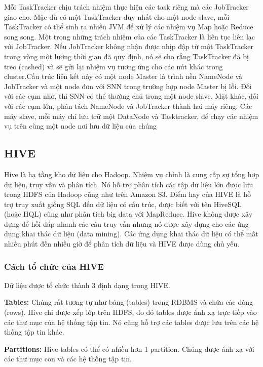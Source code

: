\begin{itemize}
Mỗi TaskTracker chịu trách nhiệm thực hiện các task riêng mà các JobTracker giao cho. Mặc dù có một TaskTracker duy nhất cho một node slave, mỗi TaskTracker có thể sinh ra nhiều JVM để xử lý các nhiệm vụ Map hoặc Reduce song song. Một trong những trách nhiệm của các TaskTracker là liên tục liên lạc với JobTracker. Nếu JobTracker không nhận được nhịp đập từ một TaskTracker trong vòng một lượng thời gian đã quy định, nó sẽ cho rằng TaskTracker đã bị treo (cashed) và sẽ gửi lại nhiệm vụ tương ứng cho các nút khác trong cluster.Cấu trúc liên kết này có một node Master là trình nền NameNode và JobTracker và một node đơn với SNN trong trường hợp node Master bị lỗi. Đối với các cụm nhở, thì SNN có thể thường chú trong một node slave. Mặt khác, đối với các cụm lớn, phân tách NameNode và JobTracker thành hai máy riêng. Các máy slave, mỗi máy chỉ lưu trữ một DataNode và Tasktracker, để chạy các nhiệm vụ trên cùng một node nơi lưu dữ liệu của chúng
\end{itemize}
\subsection{HIVE}
Hive là hạ tầng kho dữ liệu cho Hadoop. Nhiệm vụ chính là cung cấp sự tổng hợp dữ liệu, truy vấn và phân tích. Nó hỗ trợ phân tích các tập dữ liệu lớn được lưu trong HDFS của Hadoop cũng như trên Amazon S3. Điểm hay của HIVE là hỗ trợ truy xuất giống SQL đến dữ liệu có cấu trúc, được biết với tên HiveSQL (hoặc HQL) cũng như phân tích big data với MapReduce. Hive không được xây dựng để hồi đáp nhanh các câu truy vấn nhưng nó được xây dựng cho các ứng dụng khai thác dữ liệu (data mining). Các ứng dụng khai thác dữ liệu có thể mất nhiều phút đến nhiều giờ để phân tích dữ liệu và HIVE được dùng chủ yếu.\par 
\subsubsection{Cách tổ chức của HIVE}
Dữ liệu được tổ chức thành 3 định dạng trong HIVE.\par

\textbf{Tables:} Chúng rất tương tự như bảng (tables) trong RDBMS và chứa các dòng (rows). Hive chỉ được xếp lớp trên HDFS, do đó tables được ánh xạ trực tiếp vào các thư mục của hệ thống tập tin. Nó cũng hỗ trợ các tables được lưu trên các hệ thống tập tin khác.\par

\textbf{Partitions:} Hive tables có thể có nhiều hơn 1 partition. Chúng được ánh xạ với các thư mục con và các hệ thống tập tin.\par

